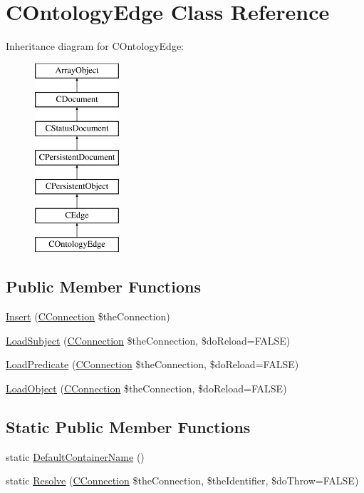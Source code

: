 \hypertarget{class_c_ontology_edge}{\section{C\-Ontology\-Edge Class Reference}
\label{class_c_ontology_edge}
}
Inheritance diagram for C\-Ontology\-Edge\-:\begin{figure}[H]
\begin{center}
\leavevmode
\includegraphics[height=7.000000cm]{class_c_ontology_edge}
\end{center}
\end{figure}
\subsection*{Public Member Functions}
\begin{DoxyCompactItemize}
\item 
\hyperlink{class_c_ontology_edge_accb7245cafff2b1f86e5ef54f0b350b8}{Insert} (\hyperlink{class_c_connection}{C\-Connection} \$the\-Connection)
\item 
\hyperlink{class_c_ontology_edge_a0f369a60b57a48e79c34537a1ec6de80}{Load\-Subject} (\hyperlink{class_c_connection}{C\-Connection} \$the\-Connection, \$do\-Reload=F\-A\-L\-S\-E)
\item 
\hyperlink{class_c_ontology_edge_a74b5faea0ec803afd1c44e739b588b63}{Load\-Predicate} (\hyperlink{class_c_connection}{C\-Connection} \$the\-Connection, \$do\-Reload=F\-A\-L\-S\-E)
\item 
\hyperlink{class_c_ontology_edge_aff6fa3df789a8915076b07062e45bec2}{Load\-Object} (\hyperlink{class_c_connection}{C\-Connection} \$the\-Connection, \$do\-Reload=F\-A\-L\-S\-E)
\end{DoxyCompactItemize}
\subsection*{Static Public Member Functions}
\begin{DoxyCompactItemize}
\item 
static \hyperlink{class_c_ontology_edge_affe02c782c1cc05ea2949cbd48b07c54}{Default\-Container\-Name} ()
\item 
static \hyperlink{class_c_ontology_edge_ad9312fa22db2de8a45f9dc5cdce204ed}{Resolve} (\hyperlink{class_c_connection}{C\-Connection} \$the\-Connection, \$the\-Identifier, \$do\-Throw=F\-A\-L\-S\-E)
\end{DoxyCompactItemize}
